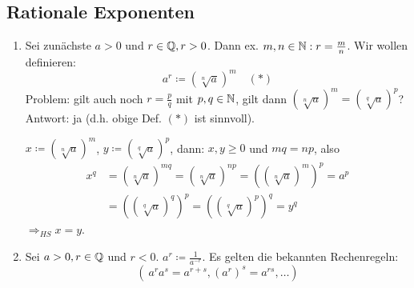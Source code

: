 \subsection*{Rationale Exponenten}
\begin{enumerate}
	\item Sei zunächste $a > 0$ und $r \in \mathbb{Q}, r > 0$. Dann ex. $m, n \in \mathbb{N} : r = \frac{m}{n}$. Wir wollen definieren:
		$$
			a^{r} \coloneqq \left( \sqrt[n]{a} \right)^{m} \quad (*)
		$$
		Problem: gilt auch noch $r = \frac{p}{q}$ mit $p, q \in \mathbb{N}$, gilt dann $\left( \sqrt[n]{a} \right)^{m} = \left( \sqrt[q]{a} \right)^{p}$? \\
		Antwort: ja (d.h. obige Def. $(*)$ ist sinnvoll).
		\begin{beweis}
			$x \coloneqq \left( \sqrt[n]{a} \right)^{m}$, $y \coloneqq \left( \sqrt[q]{a} \right)^{p}$, dann: $x, y \geq 0$ und $mq = np$, also
			\begin{align*}
				x^{q} & = \left( \sqrt[n]{a} \right)^{mq} = \left( \sqrt[n]{a} \right)^{np} = \left(  \left( \sqrt[n]{a} \right)^{m}\right)^{p} = a^{p} \\
					  & = \left( \left( \sqrt[q]{a} \right)^{q}\right)^{p} = \left( \left( \sqrt[q]{a} \right)^{p}\right)^{q} = y^{q}
			\end{align*}
			$\Rightarrow_{HS} x = y$.  
		\end{beweis}
	\item Sei $a > 0, r \in \mathbb{Q}$ und $r < 0$. $a^{r} \coloneqq \frac{1}{a^{-r}}$. Es gelten die bekannten Rechenregeln:
		$$
		\left( ~ a^{r} a^{s} = a^{r + s}, \left( a^{r} \right)^{s} = a^{rs}, \dotsc \right)
		$$
\end{enumerate}

\newpage
